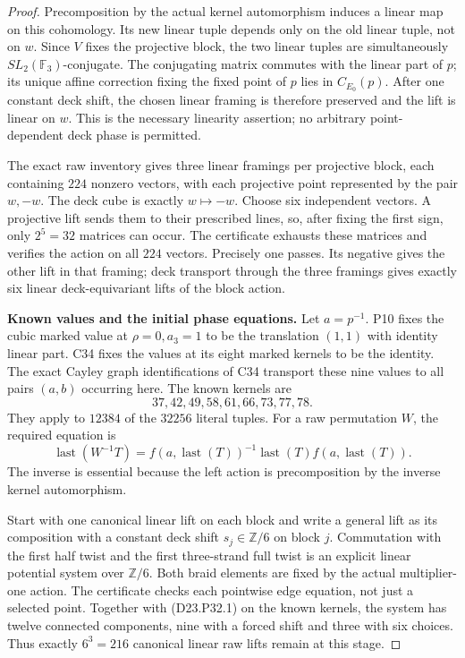 \begin{proof}
Precomposition by the actual kernel automorphism induces a
linear map on this cohomology. Its new linear tuple depends
only on the old linear tuple, not on $w$. Since $V$ fixes
the projective block, the two linear tuples are simultaneously
$SL_2(\mathbb F_3)$-conjugate. The conjugating matrix commutes
with the linear part of $p$; its unique affine correction
fixing the fixed point of $p$ lies in $C_{E_0}(p)$.
After one constant deck shift, the chosen linear framing
is therefore preserved and the lift is linear on $w$.
This is the necessary linearity assertion; no arbitrary
point-dependent deck phase is permitted.

The exact raw inventory gives three linear framings per
projective block, each containing $224$ nonzero vectors,
with each projective point represented by the pair $w,-w$.
The deck cube is exactly $w\mapsto-w$. Choose six independent
vectors. A projective lift sends them to their prescribed
lines, so, after fixing the first sign, only $2^5=32$
matrices can occur. The certificate exhausts these matrices
and verifies the action on all $224$ vectors. Precisely one
passes. Its negative gives the other lift in that framing;
deck transport through the three framings gives exactly six
linear deck-equivariant lifts of the block action.

\medskip\noindent\textbf{Known values and the initial phase equations.}\quad
Let $a=p^{-1}$. P10 fixes the cubic marked value at
$\rho=0,a_3=1$ to be the translation $(1,1)$ with identity
linear part. C34 fixes the values at its eight marked
kernels to be the identity. The exact Cayley graph
identifications of C34 transport these nine values to all
pairs $(a,b)$ occurring here. The known kernels are
\[
                  37,42,49,58,61,66,73,77,78.
\]
They apply to $12384$ of the $32256$ literal tuples.
For a raw permutation $W$, the required equation is
\[
 \operatorname{last}(W^{-1}T)
       =f(a,\operatorname{last}(T))^{-1}
          \operatorname{last}(T)
          f(a,\operatorname{last}(T)).                 \tag{D23.P32.1}
\]
The inverse is essential because the left action is
precomposition by the inverse kernel automorphism.

Start with one canonical linear lift on each block and
write a general lift as its composition with a constant
deck shift $s_j\in\mathbb Z/6$ on block $j$.
Commutation with the first half twist and the first
three-strand full twist is an explicit linear potential
system over $\mathbb Z/6$. Both braid elements are fixed
by the actual multiplier-one action. The certificate checks
each pointwise edge equation, not just a selected point.
Together with (D23.P32.1) on the known kernels, the system
has twelve connected components, nine with a forced shift
and three with six choices. Thus exactly $6^3=216$
canonical linear raw lifts remain at this stage.


\end{proof}
